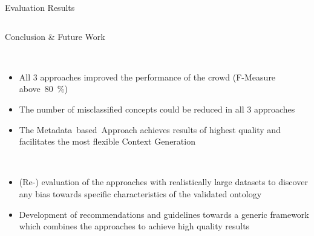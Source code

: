 \documentclass[final,hyperref={pdfpagelabels=true}]{beamer}
\begin{document}
\begin{frame}
\begin{columns}[t, onlytextwidth]
\begin{column}{\textwidth}
\begin{columns}[t, onlytextwidth]
\begin{column}{.49\textwidth}
\begin{block}{Evaluation Results}
\begin{minipage}[t][.23\textheight][c]{\textwidth}
					\end{minipage}
				\end{block}
			\end{column}
		\end{columns}
		\begin{columns}[t, onlytextwidth]
			\begin{column}{\textwidth}
				\begin{block}{Conclusion \& Future Work}
					\hfill
					\begin{minipage}[t][.09\textheight][c]{0.97\textwidth}
						\begin{multicols}{2}
							\footnotesize
							{}\\
							\vspace{-5mm}
							\begin{itemize}
								\footnotesize
								\justifying
								\setlength\itemsep{5mm}
								\item All 3 approaches improved the performance of the crowd (F-Measure above~80~\%)
								\item The number of misclassified concepts could be reduced in all 3 approaches
								\item The Metadata~based~Approach achieves results of highest quality and facilitates the most flexible Context Generation
							\end{itemize}
							\footnotesize
							{}\\
							\vspace{-1cm}
							\begin{itemize}
								\footnotesize
								\justifying
								\setlength\itemsep{5mm}
								\item (Re-) evaluation of the approaches with realistically large datasets to discover any bias towards specific characteristics of the validated ontology
								\item Development of recommendations and guidelines towards a generic framework which combines the approaches to achieve high quality results
							\end{itemize}
						\end{multicols}
					\end{minipage}
					\hfill
					\hbox{}
				\end{block}
			\end{column}
		\end{columns}
		

\end{column}
\end{columns}
\end{frame}
\end{document}
